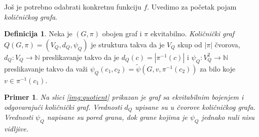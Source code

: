 \documentclass[12pt,oneside]{memoir}
\newtheorem{example}{Primer}
\theoremstyle{definition}
\newtheorem*{definition}{Definicija}
\begin{document}
  Još je potrebno odabrati konkretnu funkciju $f$. Uvedimo za početak pojam
  \emph{količničkog grafa}.

  \begin{definition}
	  Neka je $(G, \pi)$ obojen graf i $\pi$ ekvitabilno. \emph{Količnički
	  graf} $Q(G, \pi) = (V_Q, d_Q, \psi_Q)$ je struktura takva da je $V_Q$
	  skup od $|\pi|$ čvorova, $d_Q : V_Q \to \mathbb{N}$ preslikavanje takvo
	  da je $d_Q(c) = |\pi^{-1}(c)|$ i $\psi_Q : V_Q^2 \to \mathbb{N}$
	  preslikavanje takvo da važi $\psi_Q(c_1, c_2) = \widetilde{\psi}(G, v,
	  \pi^{-1}(c_2))$ za bilo koje $v \in \pi^{-1}(c_1)$.
  \end{definition}

  \begin{example}
	  Na slici \ref{img:quotient} prikazan je graf sa ekvitabilnim bojenjem i
	  odgovarajući količnički graf. Vrednosti $d_Q$ upisane su u čvorove
	  količničkog grafa. Vrednosti $\psi_Q$ napisane su pored grana, dok grane
	  kojima je $\psi_Q$ jednako nuli nisu vidljive.
  \end{example}
\end{document}
